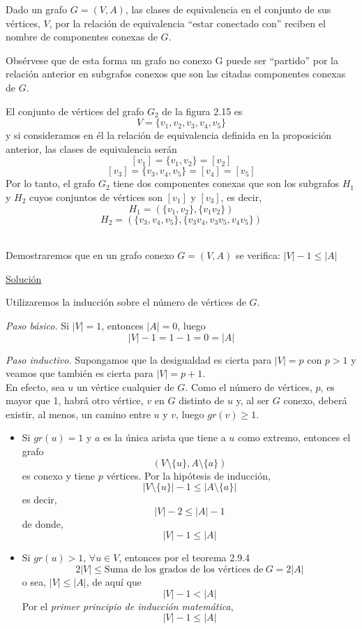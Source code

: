 \begin{fondo}
Dado un grafo $G = (V,A)$, las clases de equivalencia en el conjunto de sus vértices, $V$, por la relación de equivalencia ``estar conectado con'' reciben el nombre de componentes conexas de $G$.
\end{fondo}

Obsérvese que de esta forma un grafo no conexo G puede ser ``partido'' por la relación anterior en subgrafos conexos que son las citadas componentes conexas de $G$.

\begin{ejem}
El conjunto de vértices del grafo $G_2$ de la figura 2.15 es
\[V = \{v_1, v_2, v_3, v_4, v_5 \} \]
y si consideramos en él la relación de equivalencia definida en la proposición anterior, las clases de equivalencia serán
\[ [v_1] = \{v_1, v_2\} = [v_2] \]
\[ [v_3] = \{v_3, v_4, v_5\} = [v_4] = [v_5] \]
Por lo tanto, el grafo $G_2$ tiene dos componentes conexas que son los subgrafos $H_1$ y $H_2$ cuyos conjuntos de vértices son $[v_1]$ y $[v_3]$, es decir,
\[ H_1 = (\{v_1, v_2\}, \{v_1v_2\}) \]
\[ H_2 = (\{v_3, v_4, v_5\}, \{v_3v_4, v_3v_5, v_4v_5\}) \]
\\
\end{ejem}

\begin{ejem}
Demostraremos que en un grafo conexo $G = (V,A)$ se verifica: $|V| - 1 \leq |A|$\\
\end{ejem}

\underline{Solución}

Utilizaremos la inducción sobre el número de vértices de $G$.

\emph{Paso básico.} Si $|V| = 1$, entonces $|A| = 0$, luego
\[ |V| - 1 = 1 - 1 = 0 = |A| \]

\emph{Paso inductivo.} Supongamos que la desigualdad es cierta para $|V| = p$ con $p > 1$ y veamos que también es cierta para $|V| = p + 1$.\\

En efecto, sea $u$ un vértice cualquier de $G$. Como el número de vértices, $p$, es mayor que 1, habrá otro vértice, $v$ en $G$ distinto de $u$ y, al ser $G$ conexo, deberá existir, al menos, un camino entre $u$ y $v$, luego $gr(v) \ge 1$.\\

\begin{itemize}
\item Si $gr(u) = 1$ y $a$ es la única arista que tiene a $u$ como extremo, entonces el grafo
\[(V \setminus \{u\}, A \setminus \{a\})\]
es conexo y tiene $p$ vértices. Por la hipótesis de inducción,\\
\[ |V \setminus \{u\}| -1 \leq |A \setminus \{a\}| \]
es decir,
\[ |V| - 2 \leq |A| -1 \]
de donde,
\[ |V| - 1 \leq |A| \]
\item Si $gr(u) > 1$, $\forall u \in V$, entonces por el teorema 2.9.4
\[ 2|V| \leq \mbox{Suma de los grados de los vértices de}\ G = 2|A| \]
o sea, $|V| \leq |A|$, de aquí que
\[ |V| - 1 < |A| \]
Por el \emph{primer principio de inducción matemática},
\[ |V| - 1 \leq |A| \]
\end{itemize}

